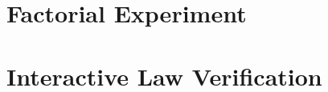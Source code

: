\documentclass[11pt]{article}
\begin{document}
\section{Factorial Experiment}\label{sec:2k-experiment}



\section{Interactive Law Verification}\label{sec:interactive-law}


\end{document}
